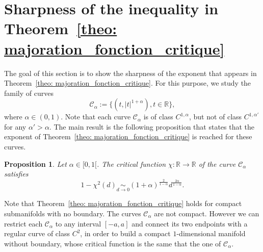 \documentclass[11pt,reqno,a4paper]{article}%
\newtheorem{proposition}[theorem]{Proposition}
\theoremstyle{definition}
\theoremstyle{remark}
\newcommand{\R}{\mathbb{R}}
\newcommand{\C}{\mathbb{C}}
\renewcommand{\C}{\mathcal{C}}
\begin{document}
\section{Sharpness of the inequality in Theorem~\ref{theo: majoration_fonction_critique}} \label{sec: Deux_exemples}
The goal of this section is to show the sharpness of the exponent that appears in Theorem~\ref{theo: majoration_fonction_critique}. For this purpose, we study the family of curves 
\[
\C_\alpha:=\{(t,|t|^{1+\alpha}),t\in \R\},
\]
where $\alpha\in(0,1)$. Note that each curve $\C_\alpha$ is of class $C^{1,\alpha}$, but not of class $C^{1,\alpha'}$ for any $\alpha'>\alpha$. The main result is the following proposition that states that the exponent of Theorem~\ref{theo: majoration_fonction_critique} is reached for these curves.
\begin{proposition} \label{prop: equivalent_fct_critique_cas_pair}
Let $\alpha\in [0,1[$. The critical function $\chi :\R\to \R$ of the curve $\C_\alpha$ satisfies
 $$1 - \chi^2(d) \underset{d \to 0}{\sim} (1+\alpha )^{ \frac{2}{1-\alpha}} d^\frac{2 \alpha}{1 - \alpha}.$$
\end{proposition}
Note that Theorem~\ref{theo: majoration_fonction_critique} holds for compact submanifolds with no boundary. The curves $\C_\alpha$ are not compact. However we can restrict each $\C_\alpha$ to any interval $[-a,a]$ and connect its two endpoints with a regular curve of class $C^2$, in order to build a compact $1$-dimensional manifold without boundary, whose critical function is the same that the one of $\C_\alpha$.\\
\end{document}
